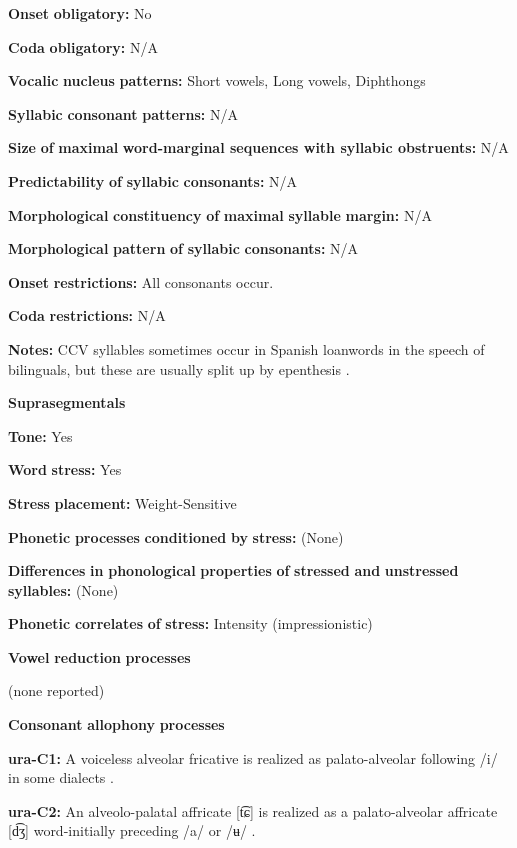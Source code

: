 \textbf{Onset} \textbf{obligatory:} No

\textbf{Coda} \textbf{obligatory:} N/A

\textbf{Vocalic} \textbf{nucleus} \textbf{patterns:} Short vowels, Long vowels, Diphthongs

\textbf{Syllabic} \textbf{consonant} \textbf{patterns:} N/A

\textbf{Size} \textbf{of} \textbf{maximal} \textbf{word{}-marginal sequences with syllabic obstruents:} N/A

\textbf{Predictability} \textbf{of} \textbf{syllabic} \textbf{consonants:} N/A

\textbf{Morphological} \textbf{constituency} \textbf{of} \textbf{maximal} \textbf{syllable} \textbf{margin:} N/A

\textbf{Morphological} \textbf{pattern} \textbf{of} \textbf{syllabic} \textbf{consonants:} N/A

\textbf{Onset} \textbf{restrictions:} All consonants occur.

\textbf{Coda} \textbf{restrictions:} N/A

\textbf{Notes:} CCV syllables sometimes occur in Spanish loanwords in the speech of bilinguals, but these are usually split up by epenthesis \citep[76]{Olawsky2006}.

\textbf{Suprasegmentals}

\textbf{Tone:} Yes

\textbf{Word} \textbf{stress:} Yes

\textbf{Stress} \textbf{placement:} Weight-Sensitive

\textbf{Phonetic} \textbf{processes} \textbf{conditioned} \textbf{by} \textbf{stress:} (None)

\textbf{Differences} \textbf{in} \textbf{phonological} \textbf{properties} \textbf{of} \textbf{stressed} \textbf{and} \textbf{unstressed} \textbf{syllables:} (None)

\textbf{Phonetic} \textbf{correlates} \textbf{of} \textbf{stress:} Intensity (impressionistic)

\textbf{Vowel} \textbf{reduction} \textbf{processes}

(none reported)

\textbf{Consonant} \textbf{allophony} \textbf{processes}

\textbf{ura-C1:} A voiceless alveolar fricative is realized as palato-alveolar following /i/ in some dialects \citep[38]{Olawsky2006}.

\textbf{ura-C2:} An alveolo-palatal affricate [t͡ɕ] is realized as a palato-alveolar affricate [d͡ʒ] word-initially preceding /a/ or /ʉ/ \citep[39]{Olawsky2006}.

